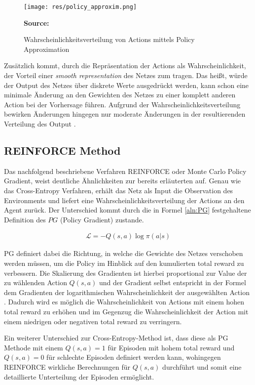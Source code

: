\documentclass[11pt]{scrartcl}
\newcommand{\source}[1]{\vspace{-5pt} \caption*{\hfill \textbf{Source:} {#1}} }
\begin{document}
\begin{figure}[htp]
\centering
\texttt{[image: res/policy\_approxim.png]}
\caption{Wahrscheinlichkeitsverteilung von Actions mittels Policy Approximation}
\source{\cite[~S.243 - Chapter 9 - Figure 1]{L2018}}
\label{fig:prob-dist-pg}
\end{figure}

Zusätzlich kommt, durch die Repräsentation der Actions als Wahrscheinlichkeit, der Vorteil einer
\textit{smooth representation} des Netzes zum tragen. Das heißt, würde der Output des Netzes über
diskrete Werte ausgedrückt werden, kann schon eine minimale Änderung an den Gewichten des Netzes 
zu einer komplett anderen Action bei der Vorhersage führen. Aufgrund der
Wahrscheinlichkeitsverteilung bewirken Änderungen hingegen nur moderate Änderungen in der
resultierenden Verteilung des Output \cite[~S.243]{L2018}.


\subsection{REINFORCE Method}
Das nachfolgend beschriebene Verfahren REINFORCE oder Monte Carlo Policy Gradient, weist
deutliche Ähnlichkeiten zur bereits erläuterten  auf.
Genau wie das Cross-Entropy Verfahren, erhält das Netz als Input die Observation des
Environments und liefert eine Wahrscheinlichkeitsverteilung der Actions an den Agent
zurück. Der Unterschied kommt durch die in Formel \ref{aln:PG} festgehaltene Definition
des $PG$ (Policy Gradient) zustande.

\begin{align}
\mathcal{L}=-Q(s,a)\log\pi(a|s)
\label{aln:PG}
\end{align}

PG definiert dabei die Richtung, in welche die Gewichte des Netzes verschoben werden müssen,
um die Policy im Hinblick auf den kumulierten total reward zu verbessern. Die Skalierung des
Gradienten ist hierbei proportional zur Value der zu wählenden Action $Q(s,a)$
und der Gradient selbst entspricht in der Formel dem Gradienten der logarithmischen
Wahrscheinlichkeit der ausgewählten Action \cite[~S.244]{L2018}. Dadurch wird es möglich
die Wahrscheinlichkeit von Actions mit einem hohen total reward zu erhöhen und im Gegenzug
die Wahrscheinlichkeit der Action mit einem niedrigen oder negativen total reward zu
verringern.

Ein weiterer Unterschied zur Cross-Entropy-Method ist, dass diese als PG Methode mit einem
$Q(s,a)=1$ für Episoden mit hohem total reward und $Q(s,a)=0$ für schlechte Episoden
definiert werden kann, wohingegen REINFORCE wirkliche Berechnungen für $Q(s,a)$ durchführt
und somit eine detaillierte Unterteilung der Episoden ermöglicht.
\end{document}
